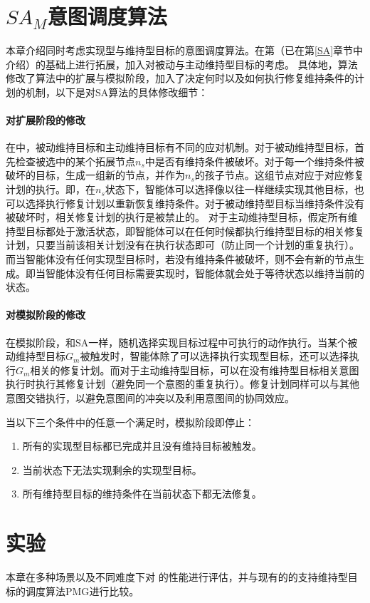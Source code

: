 \section{$SA_M$意图调度算法}
本章介绍同时考虑实现型与维持型目标的意图调度算法\SAM 。\SAM 在第\SA （已在第\ref{SA}章节中介绍）的基础上进行拓展，加入对被动与主动维持型目标的考虑。
具体地，\SAM 算法修改了\SA 算法中的扩展与模拟阶段，加入了决定何时以及如何执行修复维持条件的计划的机制，以下是对SA算法的具体修改细节：
\paragraph{对扩展阶段的修改}
在\SAM 中，被动维持目标和主动维持目标有不同的应对机制。对于被动维持型目标，\SAM 首先检查被选中的某个拓展节点$n_s$中是否有维持条件被破坏。对于每一个维持条件被破坏的目标，生成一组新的节点，并作为$n_s$的孩子节点。这组节点对应于对应修复计划的执行。即，在$n_s$状态下，智能体可以选择像以往一样继续实现其他目标，也可以选择执行修复计划以重新恢复维持条件。对于被动维持型目标当维持条件没有被破坏时，相关修复计划的执行是被禁止的。
对于主动维持型目标，\SAM 假定所有维持型目标都处于激活状态，即智能体可以在任何时候都执行维持型目标的相关修复计划，只要当前该相关计划没有在执行状态即可（防止同一个计划的重复执行）。
而当智能体没有任何实现型目标时，若没有维持条件被破坏，则不会有新的节点生成。即当智能体没有任何目标需要实现时，智能体就会处于等待状态以维持当前的状态。

\paragraph{对模拟阶段的修改}
在模拟阶段，\SAM 和SA一样，随机选择实现目标过程中可执行的动作执行。当某个被动维持型目标$G_m$被触发时，智能体除了可以选择执行实现型目标，还可以选择执行$G_m$相关的修复计划。而对于主动维持型目标，\SAM 可以在没有维持型目标相关意图执行时执行其修复计划（避免同一个意图的重复执行）。修复计划同样可以与其他意图交错执行，以避免意图间的冲突以及利用意图间的协同效应。

当以下三个条件中的任意一个满足时，模拟阶段即停止：
\begin{enumerate}
  \item 所有的实现型目标都已完成并且没有维持目标被触发。
  \item 当前状态下无法实现剩余的实现型目标。
  \item 所有维持型目标的维持条件在当前状态下都无法修复。
\end{enumerate}

\section{实验}
本章在多种场景以及不同难度下对 \SAM 的性能进行评估，并与现有的的支持维持型目标的调度算法PMG\cite{DBLP:conf/atal/DuffHT06}进行比较。

